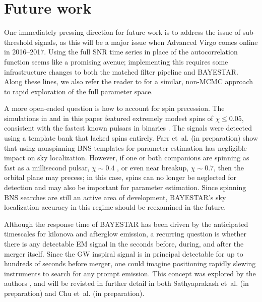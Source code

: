 \documentclass[amsmath,amssymb,aps,prx,reprint,nopreprintnumbers,nofootinbib,showpacs]{revtex4-1}
\begin{document}
\section{Future work}

One immediately pressing direction for future work is to address the issue of sub\nobreakdashes-threshold signals, as this will be a major issue when Advanced Virgo comes online in 2016\nobreakdashes--2017. Using the full \ac{SNR} time series in place of the autocorrelation function seems like a promising avenue; implementing this requires some infrastructure changes to both the matched filter pipeline and \ac{BAYESTAR}. Along these lines, we also refer the reader to \cite{PankowRapidPE} for a similar, non-\ac{MCMC} approach to rapid exploration of the full parameter space.

A more open\nobreakdashes-ended question is how to account for spin precession. The simulations in \cite{FirstTwoYears} and in this paper featured extremely modest spins of $\chi \leq 0.05$, consistent with the fastest known pulsars in binaries \citep{2003Natur.426..531B,DetectingBNSSystemsWithSpin}. The signals were detected using a template bank that lacked spins entirely. Farr et~al. (in preparation) show that using nonspinning \ac{BNS} templates for parameter estimation has negligible impact on sky localization. However, if one or both companions are spinning as fast as a millisecond pulsar, $\chi \sim 0.4$ \cite{FastestSpinningMillisecondPulsar}, or even near breakup, $\chi \sim 0.7$, then the orbital plane may precess; in this case, spins can no longer be neglected for detection \cite{DetectingBNSSystemsWithSpin} and may also be important for parameter estimation. Since spinning \ac{BNS} searches are still an active area of development, \ac{BAYESTAR}'s sky localization accuracy in this regime should be reexamined in the future.

Although the response time of \ac{BAYESTAR} has been driven by the anticipated timescales for kilonova and afterglow emission, a recurring question is whether there is any detectable \ac{EM} signal in the seconds before, during, and after the merger itself. Since the \ac{GW} inspiral signal is in principal detectable for up to hundreds of seconds before merger, one could imagine positioning rapidly slewing instruments to search for any prompt emission. This concept was explored by the authors \citep{Cannon:2011vi}, and will be revisted in further detail in both Sathyaprakash et~al. (in preparation) and Chu et~al. (in preparation).
\end{document}
